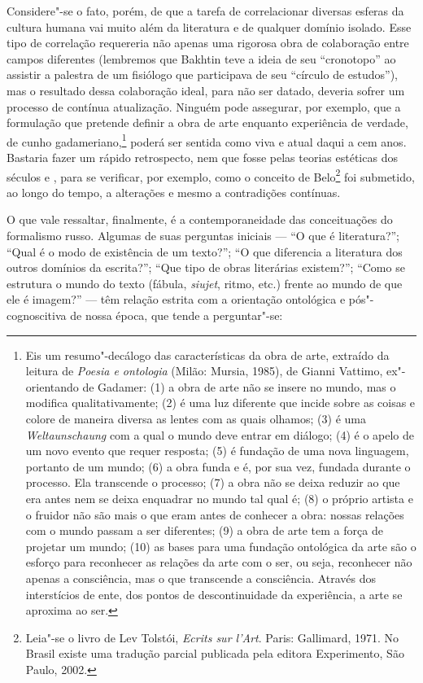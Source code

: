 Considere"-se o fato, porém, de que a tarefa de correlacionar diversas
esferas da cultura humana vai muito além da literatura e de qualquer
domínio isolado. Esse tipo de correlação requereria não apenas uma
rigorosa obra de colaboração entre campos diferentes (lembremos que Bakhtin teve a ideia de seu ``cronotopo'' ao
assistir a palestra de um fisiólogo que participava de seu ``círculo de
estudos''), mas o resultado dessa colaboração ideal, para não ser
datado, deveria sofrer um processo de contínua atualização. Ninguém pode
assegurar, por exemplo, que a formulação que pretende definir a obra de
arte enquanto experiência de verdade, de cunho
gadameriano,\footnote{Eis 
um resumo"-decálogo das características da obra de arte, extraído da 
leitura de \emph{Poesia e ontologia} (Milão: Mursia, 1985), de Gianni 
Vattimo, ex"-orientando de Gadamer: (1) a obra de arte não se insere 
no mundo, mas o modifica qualitativamente; (2) é uma luz diferente
 que incide sobre as coisas e colore de maneira diversa as lentes com 
as quais olhamos; (3) é uma \emph{Weltaunschaung} com a qual o mundo
 deve entrar em diálogo; (4) é o apelo de um novo evento que requer 
resposta; (5) é fundação de uma nova linguagem, portanto de um mundo; 
(6) a obra funda e é, por sua vez, fundada durante o processo. Ela
 transcende o processo; (7) a obra não se deixa reduzir ao que era 
antes nem se deixa enquadrar no mundo tal qual é;
(8) o próprio artista e o fruidor não são mais o que eram antes
 de conhecer a obra: nossas relações com o mundo passam a ser 
diferentes; (9) a obra de arte tem a força de projetar um mundo; (10)
 as bases para uma fundação ontológica da arte são o esforço para
 reconhecer as relações da arte com o ser, ou seja, reconhecer não 
apenas a consciência, mas o que transcende a consciência. Através dos 
interstícios de ente, dos pontos de descontinuidade da experiência, a 
arte se aproxima ao ser.} poderá ser sentida como viva e atual daqui 
a cem anos. Bastaria fazer um rápido retrospecto, nem que fosse pelas
 teorias estéticas dos séculos  e , para se 
verificar, por exemplo, como o conceito de Belo\footnote{Leia"-se o 
livro de Lev Tolstói, \emph{Ecrits sur l'Art}. Paris: Gallimard, 1971.
 No Brasil existe uma tradução parcial publicada pela editora 
Experimento, São Paulo, 2002.} foi submetido, ao longo do tempo, a 
alterações e mesmo a contradições contínuas.

O que vale ressaltar, finalmente, é a contemporaneidade das
conceituações do formalismo russo. Algumas de suas perguntas iniciais
--- ``O que é literatura?''; ``Qual é o modo de existência de um texto?'';
``O que diferencia a literatura dos outros domínios da escrita?''; ``Que
tipo de obras literárias existem?''; ``Como se estrutura o mundo do
texto (fábula, \emph{siujet}, ritmo, etc.) frente ao mundo de que ele é
imagem?'' --- têm relação estrita com a orientação ontológica e
pós"-cognoscitiva de nossa época, que tende a perguntar"-se:

